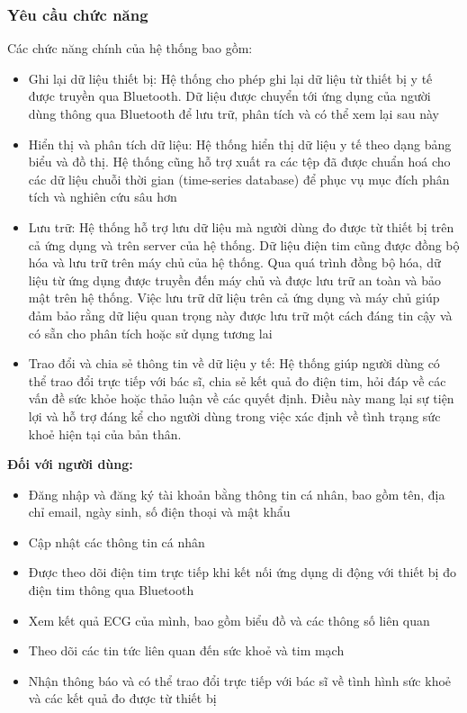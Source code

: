 \subsubsection{Yêu cầu chức năng}
Các chức năng chính của hệ thống bao gồm:
\begin{adjustwidth}{1.5em}{}
  \begin{itemize}
      \item Ghi lại dữ liệu thiết bị: Hệ thống cho phép ghi lại dữ liệu từ thiết bị y tế được truyền qua Bluetooth. Dữ liệu được chuyển tới ứng dụng của người dùng thông qua Bluetooth để lưu trữ, phân tích và có thể xem lại sau này
      \item Hiển thị và phân tích dữ liệu: Hệ thống hiển thị dữ liệu y tế theo dạng bảng biểu và đồ thị. Hệ thống cũng hỗ trợ xuất ra các tệp đã được chuẩn hoá cho các dữ liệu chuỗi thời gian (time-series database) để phục vụ mục đích phân tích và nghiên cứu sâu hơn
      \item Lưu trữ: Hệ thống hỗ trợ lưu dữ liệu mà người dùng đo được từ thiết bị trên cả ứng dụng và trên server của hệ thống. Dữ liệu điện tim cũng được đồng bộ hóa và lưu trữ trên máy chủ của hệ thống. Qua quá trình đồng bộ hóa, dữ liệu từ ứng dụng được truyền đến máy chủ và được lưu trữ an toàn và bảo mật trên hệ thống. Việc lưu trữ dữ liệu trên cả ứng dụng và máy chủ giúp đảm bảo rằng dữ liệu quan trọng này được lưu trữ một cách đáng tin cậy và có sẵn cho phân tích hoặc sử dụng tương lai
      \item Trao đổi và chia sẻ thông tin về dữ liệu y tế: Hệ thống giúp người dùng có thể trao đổi trực tiếp với bác sĩ, chia sẻ kết quả đo điện tim, hỏi đáp về các vấn đề sức khỏe hoặc thảo luận về các quyết định. Điều này mang lại sự tiện lợi và hỗ trợ đáng kể cho người dùng trong việc xác định về tình trạng sức khoẻ hiện tại của bản thân.
  \end{itemize}
\end{adjustwidth}
\textbf{Đối với người dùng:}
\begin{adjustwidth}{1.5em}{}
\begin{itemize}
    \item Đăng nhập và đăng ký tài khoản bằng thông tin cá nhân, bao gồm tên, địa chỉ email, ngày sinh, số điện thoại và mật khẩu
    \item Cập nhật các thông tin cá nhân
    \item Được theo dõi điện tim trực tiếp khi kết nối ứng dụng di động với thiết bị đo điện tim thông qua Bluetooth
    \item Xem kết quả ECG của mình, bao gồm biểu đồ và các thông số liên quan
    \item Theo dõi các tin tức liên quan đến sức khoẻ và tim mạch
    \item Nhận thông báo và có thể trao đổi trực tiếp với bác sĩ về tình hình sức khoẻ và các kết quả đo được từ thiết bị
\end{itemize}
\end{adjustwidth}
